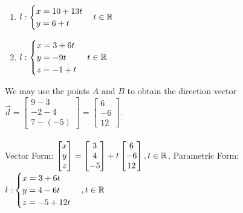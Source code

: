 \begin{SaveQuestion}
    \begin{enumerate}
        \item $l: \begin{cases} 
      x=10+13t \\
      y=6+t 
        \end{cases} t \in \mathbb{R}$
        \item $l: \begin{cases} 
      x=3+6t \\
      y=-9t \\
      z=-1+t 
        \end{cases} t \in \mathbb{R}$
    \end{enumerate}
\end{SaveQuestion}






\begin{SaveQuestion}
    We may use the points $A$ and $B$ to obtain the direction vector $\vec d = \begin{bmatrix} 9-3 \\ -2-4 \\ 7-(-5) \end{bmatrix} = \begin{bmatrix} 6 \\ -6 \\ 12 \end{bmatrix}$. \\ \\
    Vector Form:
    $\begin{bmatrix} x \\ y \\ z \end{bmatrix} = \begin{bmatrix} 3 \\ 4 \\ -5 \end{bmatrix} + t \begin{bmatrix} 6 \\ -6 \\ 12 \end{bmatrix}, t\in \mathbb{R}$.
    Parametric Form:
    $l: 
    \begin{cases} 
      x=3+6t \\
      y=4-6t \\
      z=-5+12t 
    \end{cases}, t \in \mathbb{R}$
\end{SaveQuestion}

